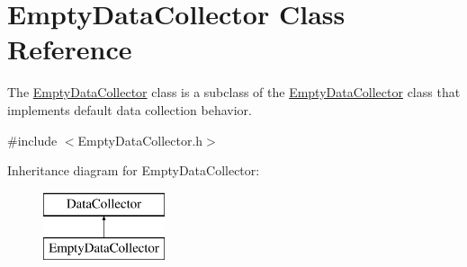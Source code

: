 \hypertarget{classEmptyDataCollector}{}\section{Empty\+Data\+Collector Class Reference}
\label{classEmptyDataCollector}


The {\ttfamily \mbox{\hyperlink{classEmptyDataCollector}{Empty\+Data\+Collector}}} class is a subclass of the {\ttfamily \mbox{\hyperlink{classEmptyDataCollector}{Empty\+Data\+Collector}}} class that implements default data collection behavior.  




{\ttfamily \#include $<$Empty\+Data\+Collector.\+h$>$}

Inheritance diagram for Empty\+Data\+Collector\+:\begin{figure}[H]
\begin{center}
\leavevmode
\includegraphics[height=2.000000cm]{classEmptyDataCollector}
\end{center}
\end{figure}
